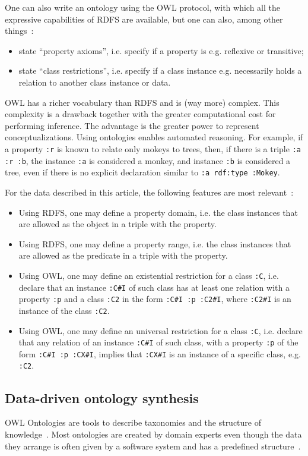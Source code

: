 \documentclass[journal,article,submit,moreauthors,pdftex]{Definitions/mdpi}
\newcommand{\textttt}[1] {\texttt{\footnotesize#1}}
\begin{document}
One can also write an ontology using the OWL protocol,
with which all the expressive capabilities of RDFS are
available, but one can also, among other things~\cite{owl}:
\begin{itemize}
  \item state ``property axioms'', i.e. specify if a property is e.g. reflexive or transitive;
  \item state ``class restrictions'', i.e. specify if a class instance e.g. necessarily holds a relation to another class instance or data.
\end{itemize}
OWL has a richer vocabulary than RDFS and is (way more) complex.
This complexity is a drawback together with the greater computational cost
for performing inference.
The advantage is the greater power to represent conceptualizations.
Using ontologies enables automated reasoning.
For example, if a property \textttt{:r} is known to relate only mokeys to trees,
then, if there is a triple \textttt{:a :r :b}, the instance \textttt{:a} is considered a monkey,
and instance \textttt{:b} is considered a tree,
even if there is no explicit declaration similar
to \textttt{:a rdf:type :Mokey}.

For the data described in this article, the following features are most relevant~\cite{rdfs,owl}:
\begin{itemize}
  \item Using RDFS, one may define a property domain, i.e. the class instances that are allowed as the object in a triple with the property.
  \item Using RDFS, one may define a property range, i.e. the class instances that are allowed as the predicate in a triple with the property.
  \item Using OWL, one may define an existential restriction for a class \textttt{:C},
    i.e. declare that an instance \textttt{:C\#I} of such class has at least one relation with a property \textttt{:p} and a class \textttt{:C2} in the form
    \textttt{:C\#I :p :C2\#I}, where \textttt{:C2\#I} is an instance of the class \textttt{:C2}.
  \item Using OWL, one may define an universal restriction for a class \textttt{:C},
    i.e. declare that any relation of an instance \textttt{:C\#I} of such class, with a property \textttt{:p} of the form \textttt{:C\#I :p :CX\#I},
    implies that \textttt{:CX\#I} is an instance of a specific class, e.g. \textttt{:C2}.
\end{itemize}


\subsection{Data-driven ontology synthesis}\label{ont}
OWL Ontologies are tools to describe taxonomies and the
structure of knowledge~\cite{owl1}.
Most ontologies are created by domain experts even though the data they
arrange is often given by a software system and has a predefined
structure~\cite{owl2}. 
\end{document}
